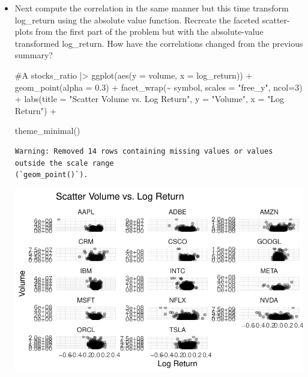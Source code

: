 \documentclass[
  letterpaper,
  DIV=11,
  numbers=noendperiod]{scrartcl}
\newenvironment{Shaded}{\begin{snugshade}}{\end{snugshade}}
\newcommand{\AttributeTok}[1]{\textcolor[rgb]{0.40,0.45,0.13}{#1}}
\newcommand{\CommentTok}[1]{\textcolor[rgb]{0.37,0.37,0.37}{#1}}
\newcommand{\DecValTok}[1]{\textcolor[rgb]{0.68,0.00,0.00}{#1}}
\newcommand{\FloatTok}[1]{\textcolor[rgb]{0.68,0.00,0.00}{#1}}
\newcommand{\FunctionTok}[1]{\textcolor[rgb]{0.28,0.35,0.67}{#1}}
\newcommand{\NormalTok}[1]{\textcolor[rgb]{0.00,0.23,0.31}{#1}}
\newcommand{\SpecialCharTok}[1]{\textcolor[rgb]{0.37,0.37,0.37}{#1}}
\newcommand{\StringTok}[1]{\textcolor[rgb]{0.13,0.47,0.30}{#1}}
\begin{document}
\begin{itemize}
\item
  Next compute the correlation in the same manner but this time
  transform log\_return using the absolute value function. Recreate the
  faceted scatter-plots from the first part of the problem but with the
  absolute-value transformed log\_return. How have the correlations
  changed from the previous summary?

\begin{Shaded}
\begin{Highlighting}[]
\CommentTok{\#A}
\NormalTok{stocks\_ratio }\SpecialCharTok{|\textgreater{}}
  \FunctionTok{ggplot}\NormalTok{(}\FunctionTok{aes}\NormalTok{(}\AttributeTok{y =}\NormalTok{ volume, }\AttributeTok{x =}\NormalTok{ log\_return)) }\SpecialCharTok{+}
  \FunctionTok{geom\_point}\NormalTok{(}\AttributeTok{alpha =} \FloatTok{0.3}\NormalTok{) }\SpecialCharTok{+}
  \FunctionTok{facet\_wrap}\NormalTok{(}\SpecialCharTok{\textasciitilde{}}\NormalTok{ symbol, }\AttributeTok{scales =} \StringTok{"free\_y"}\NormalTok{, }\AttributeTok{ncol=}\DecValTok{3}\NormalTok{) }\SpecialCharTok{+}
  \FunctionTok{labs}\NormalTok{(}\AttributeTok{title =} \StringTok{"Scatter Volume vs. Log Return"}\NormalTok{,}
       \AttributeTok{y =} \StringTok{"Volume"}\NormalTok{,}
       \AttributeTok{x =} \StringTok{"Log Return"}\NormalTok{) }\SpecialCharTok{+}

  \FunctionTok{theme\_minimal}\NormalTok{()}
\end{Highlighting}
\end{Shaded}

\begin{verbatim}
Warning: Removed 14 rows containing missing values or values outside the scale range
(`geom_point()`).
\end{verbatim}

  \includegraphics{Lab4_files/figure-pdf/problem3-1.pdf}


\end{itemize}
\end{document}
